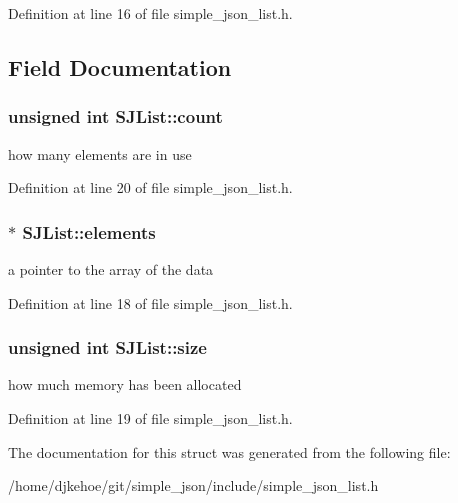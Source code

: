 Definition at line 16 of file simple\+\_\+json\+\_\+list.\+h.



\subsection{Field Documentation}
\subsubsection[{\texorpdfstring{count}{count}}]{\setlength{\rightskip}{0pt plus 5cm}unsigned int S\+J\+List\+::count}\hypertarget{structSJList_a706017d74f3cde16157127d8e8025116}{}\label{structSJList_a706017d74f3cde16157127d8e8025116}
how many elements are in use 

Definition at line 20 of file simple\+\_\+json\+\_\+list.\+h.

\subsubsection[{\texorpdfstring{elements}{elements}}]{$\ast$ S\+J\+List\+::elements}\hypertarget{structSJList_a43fc72ebe9774607d3c503917b911c7c}{}\label{structSJList_a43fc72ebe9774607d3c503917b911c7c}
a pointer to the array of the data 

Definition at line 18 of file simple\+\_\+json\+\_\+list.\+h.

\subsubsection[{\texorpdfstring{size}{size}}]{\setlength{\rightskip}{0pt plus 5cm}unsigned int S\+J\+List\+::size}\hypertarget{structSJList_a1e3944d88b5e2aac09698498f376559b}{}\label{structSJList_a1e3944d88b5e2aac09698498f376559b}
how much memory has been allocated 

Definition at line 19 of file simple\+\_\+json\+\_\+list.\+h.



The documentation for this struct was generated from the following file\+:\begin{DoxyCompactItemize}
\item 
/home/djkehoe/git/simple\+\_\+json/include/simple\+\_\+json\+\_\+list.\+h\end{DoxyCompactItemize}
